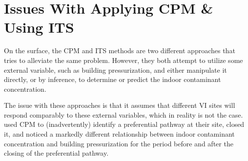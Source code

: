 \begin{comment}
Main point is to point the issues with manipulating or utilizing an external variable.
I.e. sites give different responses to the same stimuli.
Again present a few examples of this (maybe just one?), but perhaps quite short as this will be covered in more detail in subsequent chapters.

Present thesis at the end of this section? (Probably)

Thesis:

Manipulation or use of external variables in VI will not yield the desired outcome, unless we improve our physical or mechanistic understanding of how these variables affect contaminant transport (or other phenomena).

Specifically, considering or determining the nature of the contaminant transport, whether advective or diffusive transport dominates, as it is key for understanding why different sites respond so differently to a change in pressurization.

For example, if contaminant transport is dominated diffusion, almost no relationship between entry rate and pressurization will exist, and as such pressurization might be a poor ITS, or CPM might not be as effective at such a site.

On the other hand, if advective transport dominates, pressurization can be a great ITS as advective transport is driven to a large degree by a pressure gradient.
\end{comment}

\section{Issues With Applying CPM \& Using ITS} %

On the surface, the CPM and ITS methods are two different approaches that tries to alleviate the same problem.
However, they both attempt to utilize some external variable, such as building pressurization, and either manipulate it directly, or by inference, to determine or predict the indoor contaminant concentration.

The issue with these approaches is that it assumes that different VI sites will respond comparably to these external variables, which in reality is not the case.
\citeauthor{guo_identification_2015}\cite{guo_identification_2015} used CPM to (inadvertently) identify a preferential pathway at their site, closed it, and noticed a markedly different relationship between indoor contaminant concentration and building pressurization for the period before and after the closing of the preferential pathway.\par %

